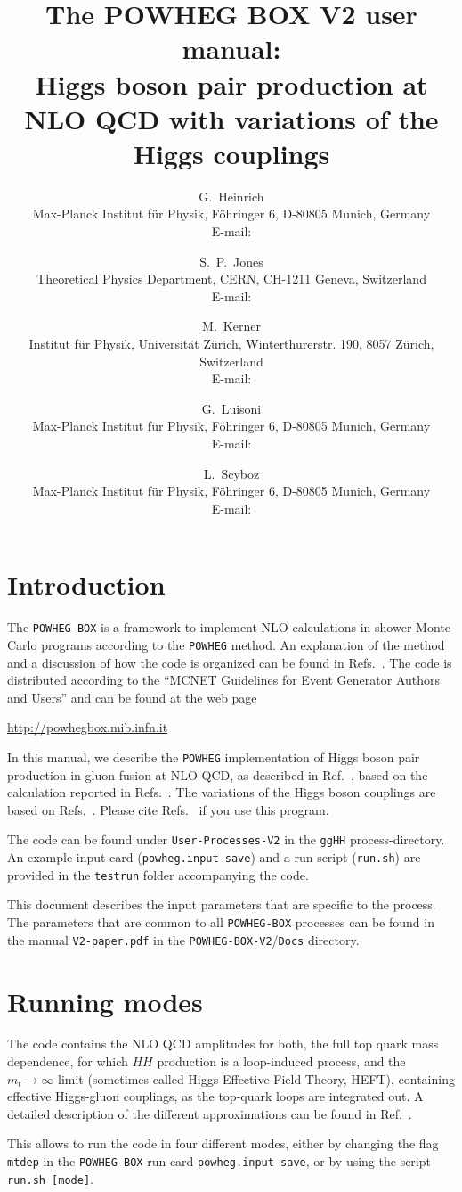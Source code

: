 \documentclass[paper]{JHEP3}
\title{The POWHEG BOX V2 user manual:\\
  Higgs boson pair production at NLO QCD with variations of the Higgs couplings} \vfill
\author{G.~Heinrich\\ 
  Max-Planck Institut f{\"u}r Physik, F\"ohringer 6, D-80805 Munich, Germany\\
  E-mail: \email{gudrun@mpp.mpg.de}
}
\author{S.~P.~Jones \\ 
Theoretical Physics Department, CERN, CH-1211 Geneva, Switzerland  \\
  E-mail: \email{s.jones@cern.ch}
}
\author{M.~Kerner \\ 
  Institut f{\"u}r Physik, Universit{\"a}t Z{\"u}rich, Winterthurerstr. 190, 8057 Z{\"u}rich, Switzerland\\
  E-mail: \email{kerner@mpp.mpg.de}
}
\author{G.~Luisoni\\
Max-Planck Institut f{\"u}r Physik, F\"ohringer 6, D-80805 Munich, Germany\\ 
  E-mail: \email{luisonig@gmail.com}
  }
\author{L.~Scyboz\\
 Max-Planck Institut f{\"u}r Physik, F\"ohringer 6, D-80805 Munich, Germany\\ 
  E-mail: \email{scyboz@mpp.mpg.de}
}
\newcommand\POWHEG{{\tt POWHEG}}
\newcommand\POWHEGBOX{{\tt POWHEG-BOX}}
\newcommand\POWHEGBOXV{{\tt POWHEG-BOX-V2}}
\begin{document}
\section{Introduction}

The \POWHEGBOX{} is a framework to implement NLO
calculations in shower Monte Carlo programs according to the \POWHEG{}
method. An explanation of the method and a discussion of how the code
is organized can be found in
Refs.~\cite{Nason:2004rx,Frixione:2007vw,Alioli:2010xd,Jezo:2015aia}.
The code is distributed according to the ``MCNET Guidelines for Event
Generator Authors and Users'' and can be found at the web page
%
\begin{center}
 \url{http://powhegbox.mib.infn.it}
\end{center}
%
In this manual, we describe the \POWHEG{} implementation of Higgs
boson pair production in gluon fusion at NLO QCD, as described in
Ref.~\cite{Heinrich:2017kxx}, based on the calculation reported in
Refs.~\cite{Borowka:2016ehy,Borowka:2016ypz}.  
The variations of the Higgs boson couplings are based on Refs.~\cite{Heinrich:2019bkc,Buchalla:2018yce}.
Please cite Refs.~\cite{Heinrich:2019bkc,Heinrich:2017kxx} if you use this program.

The code can be found under {\tt User-Processes-V2} in the {\tt ggHH} process-directory. 
An example input card ({\tt powheg.input-save}) and a run script ({\tt run.sh}) 
are provided in the {\tt testrun} folder accompanying the code.

This document describes the input parameters that are specific to the process. The
parameters that are common to all \POWHEGBOX{} processes can be found
in the manual {\tt V2-paper.pdf} in the \POWHEGBOXV{}/{\tt Docs} directory.

\section{Running modes}
The code contains the NLO QCD amplitudes for both, the full top quark mass dependence, 
for which $HH$ production is a loop-induced process, and the
$m_t\to \infty$ limit (sometimes called Higgs Effective Field Theory, HEFT), 
containing effective Higgs-gluon couplings, as the top-quark loops are integrated out.  
A detailed description of the different approximations can be found in Ref.~\cite{Borowka:2016ypz}.

This allows to run the code in four different modes, either by
changing the flag {\tt mtdep} in the \POWHEGBOX{} run card {\tt powheg.input-save}, or by using the script {\tt run.sh [mode]}.
\end{document}
